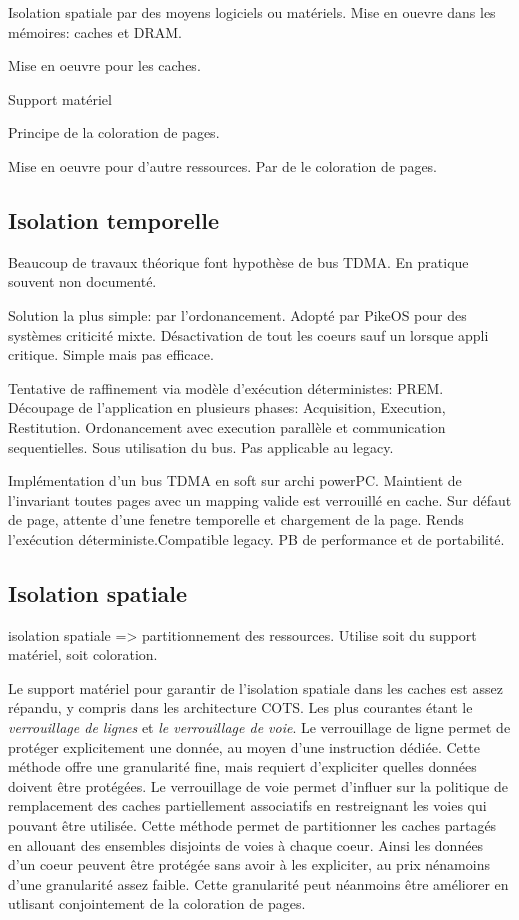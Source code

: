Isolation spatiale par des moyens logiciels ou matériels. 
Mise en ouevre dans les mémoires: caches et DRAM.

Mise en oeuvre pour les caches.

Support matériel

Principe de la coloration de pages.

Mise en oeuvre pour d'autre ressources.
Par de le coloration de pages.

\subsection{Isolation temporelle}

Beaucoup de travaux théorique font hypothèse de bus TDMA. En pratique souvent non documenté.

Solution la plus simple: par l'ordonancement. Adopté par PikeOS pour des systèmes criticité mixte.
Désactivation de tout les coeurs sauf un lorsque appli critique. Simple mais pas efficace.

Tentative de raffinement via modèle d'exécution déterministes: PREM.
Découpage de l'application en plusieurs phases: Acquisition, Execution, Restitution.
Ordonancement avec execution parallèle et communication sequentielles.
Sous utilisation du bus. Pas applicable au legacy.

Implémentation d'un bus TDMA en soft sur archi powerPC. Maintient de l'invariant toutes pages avec un mapping valide est verrouillé en cache. Sur défaut de page, attente d'une fenetre temporelle et chargement de la page. Rends l'exécution déterministe.Compatible legacy. PB de performance et de portabilité.


\subsection{Isolation spatiale}

isolation spatiale => partitionnement des ressources.
Utilise soit du support matériel, soit coloration.

Le support matériel pour garantir de l'isolation spatiale dans les caches est assez répandu, y compris dans les architecture COTS.
Les plus courantes étant le \emph{verrouillage de lignes} et \emph{le verrouillage de voie}.
Le verrouillage de ligne permet de protéger explicitement une donnée, au moyen d'une instruction dédiée.
Cette méthode offre une granularité fine, mais requiert d'expliciter quelles données doivent être protégées.
Le verrouillage de voie permet d'influer sur la politique de remplacement des caches partiellement associatifs en restreignant les voies qui pouvant être utilisée.
Cette méthode permet de partitionner les caches partagés en allouant des ensembles disjoints de voies à chaque coeur.
Ainsi les données d'un coeur peuvent être protégée sans avoir à les expliciter, au prix nénamoins d'une granularité assez faible.
Cette granularité peut néanmoins être améliorer en utlisant conjointement de la coloration de pages.

